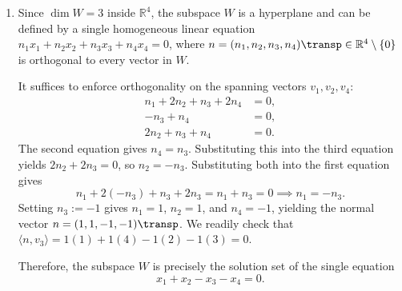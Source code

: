 \begin{exercisesolution*}
\begin{enumerate}[label=\textbf{(\alph*)}]
    \item Since $\dim W = 3$ inside $\mathbb{R}^4$, the subspace $W$ is a hyperplane and can be defined by a single homogeneous linear equation $n_1 x_1 + n_2 x_2 + n_3 x_3 + n_4 x_4 = 0$, where $n = (n_1, n_2, n_3, n_4)\transp \in \mathbb{R}^4 \setminus \{0\}$ is orthogonal to every vector in $W$.
    
    It suffices to enforce orthogonality on the spanning vectors $v_1, v_2, v_4$:
    \[
        \begin{aligned}
            n_1 + 2n_2 + n_3 + 2n_4 &= 0, \\
            -n_3 + n_4 &= 0, \\
            2n_2 + n_3 + n_4 &= 0.
        \end{aligned}
    \]
    The second equation gives $n_4 = n_3$. Substituting this into the third equation yields $2n_2 + 2n_3 = 0$, so $n_2 = -n_3$. Substituting both into the first equation gives
    \[
        n_1 + 2(-n_3) + n_3 + 2n_3 = n_1 + n_3 = 0 \implies n_1 = -n_3.
    \]
    Setting $n_3 := -1$ gives $n_1 = 1$, $n_2 = 1$, and $n_4 = -1$, yielding the normal vector $n = (1, 1, -1, -1)\transp$. We readily check that $\langle n, v_3 \rangle = 1(1) + 1(4) - 1(2) - 1(3) = 0$.
    
    Therefore, the subspace $W$ is precisely the solution set of the single equation
    \[
        x_1 + x_2 - x_3 - x_4 = 0.
    \]


\end{enumerate}
\end{exercisesolution*}
